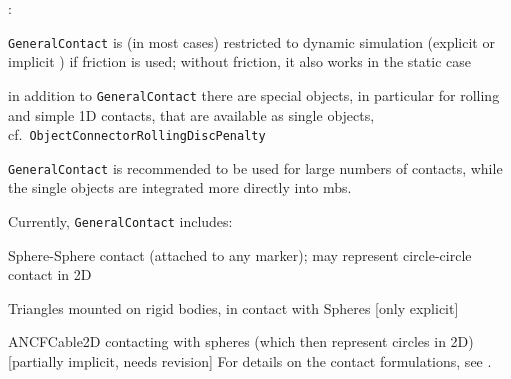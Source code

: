 
\noindent {}:
\bi
\item \texttt{GeneralContact} is (in most cases) restricted to dynamic simulation (explicit or implicit \lbrack{}\rbrack ) if friction is used; without friction, it also works in the static case
\item in addition to \texttt{GeneralContact} there are special objects, in particular for rolling and simple 1D contacts, that are available as single objects, cf.\ \texttt{ObjectConnectorRollingDiscPenalty}
\item \texttt{GeneralContact} is recommended to be used for large numbers of contacts, while the single objects are integrated more directly into mbs.
\ei

\noindent Currently, \texttt{GeneralContact} includes:
\bi
  \item Sphere-Sphere contact (attached to any marker); may represent circle-circle contact in 2D
  \item Triangles mounted on rigid bodies, in contact with Spheres [only explicit]
  \item ANCFCable2D contacting with spheres (which then represent circles in 2D) [partially implicit, needs revision]
\ei
For details on the contact formulations, see .

